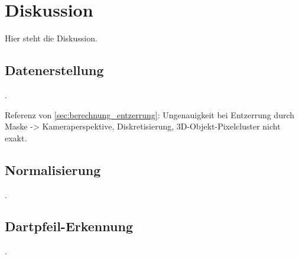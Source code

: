 
\chapter{Diskussion}
\label{cha:diskussion}

Hier steht die Diskussion.

\section{Datenerstellung}
\label{sec:diskussion:daten}

.

Referenz von \autoref{sec:berechnung_entzerrung}: Ungenauigkeit bei Entzerrung durch Maske -> Kameraperspektive, Diskretisierung, 3D-Objekt-Pixelcluster nicht exakt.

\section{Normalisierung}
\label{sec:diskussion:cv}

.

\section{Dartpfeil-Erkennung}
\label{sec:diskussion:ki}

. 
